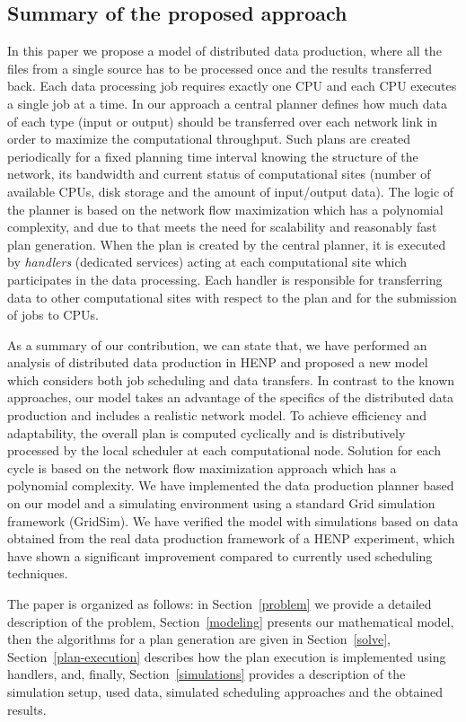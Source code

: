 \documentclass{svjour3}                     %
\begin{document}
\subsection{Summary of the proposed approach}
In this paper we propose a model of distributed data production, where all the files from a single source has to be processed once and the results transferred back. Each data processing job requires exactly one CPU and each CPU executes a single job at a time. In our approach a central planner defines how much data of each type (input or output) should be transferred over each network link in order to maximize the computational throughput. Such plans are created periodically for a fixed planning time interval knowing the structure of the network, its bandwidth and current status of computational sites (number of available CPUs, disk storage and the amount of input/output data). The logic of the planner is based on the network flow maximization which has a polynomial complexity, and due to that meets the need for scalability and reasonably fast plan generation. When the plan is created by the central planner, it is executed by \textit{handlers} (dedicated services) acting at each computational site which participates in the data processing. Each handler is responsible for transferring data to other computational sites with respect to the plan and for the submission of jobs to CPUs. 
 
As a summary of our contribution, we can state that, we have performed an analysis of distributed data production in HENP and proposed a new model which considers both job scheduling and data transfers. In contrast to the known approaches, our model takes an advantage of the specifics of the distributed data production and includes a realistic network model. To achieve efficiency and adaptability, the overall plan is computed cyclically and is distributively processed by the local scheduler at each computational node. Solution for each cycle is based on the network flow maximization approach which has a polynomial complexity. We have implemented the data production planner based on our model and a simulating environment using a standard Grid simulation framework (GridSim). We have verified the model with simulations based on data obtained from the real data production framework of a HENP experiment, which have shown a significant improvement compared to currently used scheduling techniques. 

\hfill 

The paper is organized as follows: in Section~\ref{problem} we provide a detailed description of the problem, Section~\ref{modeling} presents our mathematical model, then the algorithms for a plan generation are given in Section~\ref{solve}, Section~\ref{plan-execution} describes how the plan execution is implemented using handlers, and, finally, Section~\ref{simulations} provides a description of the simulation setup, used data, simulated scheduling approaches and the obtained results. 
\end{document}
